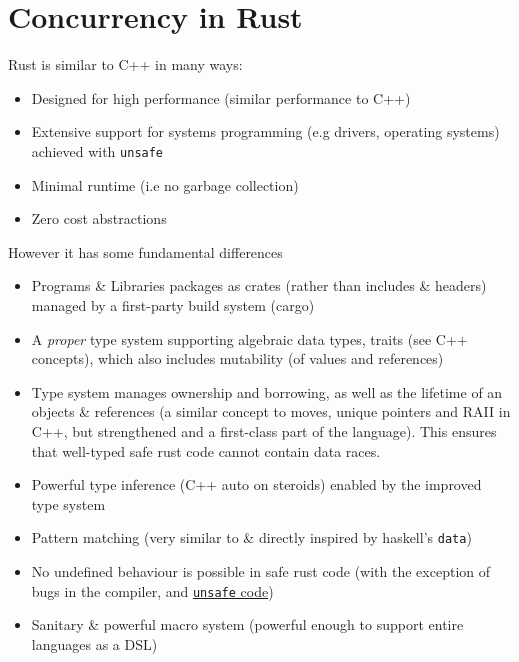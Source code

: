 \chapter{Concurrency in Rust}

Rust is similar to C++ in many ways:
\begin{itemize}
	\item Designed for high performance (similar performance to C++)
	\item Extensive support for systems programming (e.g drivers, operating systems) achieved with \texttt{unsafe}
	\item Minimal runtime (i.e no garbage collection)
	\item Zero cost abstractions
\end{itemize}
However it has some fundamental differences
\begin{itemize}
	\item Programs \& Libraries packages as crates (rather than includes \& headers) managed by a first-party build system (cargo)
	\item A \textit{proper} type system supporting algebraic data types, traits (see C++ concepts), which also includes mutability (of values and references)
	\item Type system manages ownership and borrowing, as well as the lifetime of an objects \& references (a similar concept to moves, unique pointers and RAII in C++, but strengthened and a first-class part of the language). This ensures that well-typed safe rust code cannot contain data races.
	\item Powerful type inference (C++ auto on steroids) enabled by the improved type system
	\item Pattern matching (very similar to \& directly inspired by haskell's \texttt{data})
	\item No undefined behaviour is possible in safe rust code (with the exception of bugs in the compiler, and \href{https://doc.rust-lang.org/reference/behavior-considered-undefined.html}{\texttt{unsafe} code})
	\item Sanitary \& powerful macro system (powerful enough to support entire languages as a DSL)
\end{itemize}

